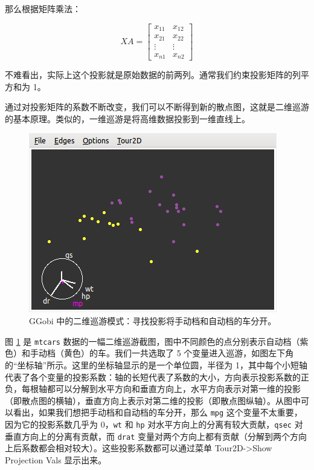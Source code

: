 \documentclass[
  b5paper,
  UTF8,twoside]{book}
\begin{document}
那么根据矩阵乘法：

\[XA = \left[\begin{array}{cc}
x_{11} & x_{12}\\
x_{21} & x_{22}\\
\vdots & \vdots\\
x_{n1} & x_{n2}
\end{array}\right]\]

不难看出，实际上这个投影就是原始数据的前两列。通常我们约束投影矩阵的列平方和为 1。

通过对投影矩阵的系数不断改变，我们可以不断得到新的散点图，这就是二维巡游的基本原理。类似的，一维巡游是将高维数据投影到一维直线上。

\begin{figure}

{\centering \includegraphics{images/GGobi-2d-tour} 

}

\caption[GGobi 中的二维巡游模式 ]{GGobi 中的二维巡游模式：寻找投影将手动档和自动档的车分开。}\label{fig:GGobi-2d-tour}
\end{figure}



图 \ref{fig:GGobi-2d-tour} 是 \texttt{mtcars} 数据的一幅二维巡游截图，图中不同颜色的点分别表示自动档（紫色）和手动档（黄色）的车。我们一共选取了 5 个变量进入巡游，如图左下角的``坐标轴''所示。这里的坐标轴显示的是一个单位圆，半径为 1，其中每个小短轴代表了各个变量的投影系数：轴的长短代表了系数的大小，方向表示投影系数的正负，每根轴都可以分解到水平方向和垂直方向上，水平方向表示对第一维的投影（即散点图的横轴），垂直方向上表示对第二维的投影（即散点图纵轴）。从图中可以看出，如果我们想把手动档和自动档的车分开，那么 \texttt{mpg} 这个变量不太重要，因为它的投影系数几乎为 0，\texttt{wt} 和 \texttt{hp} 对水平方向上的分离有较大贡献，\texttt{qsec} 对垂直方向上的分离有贡献，而 \texttt{drat} 变量对两个方向上都有贡献（分解到两个方向上后系数都会相对较大）。这些投影系数都可以通过菜单 Tour2D-\textgreater Show Projection Vals 显示出来。
\end{document}
